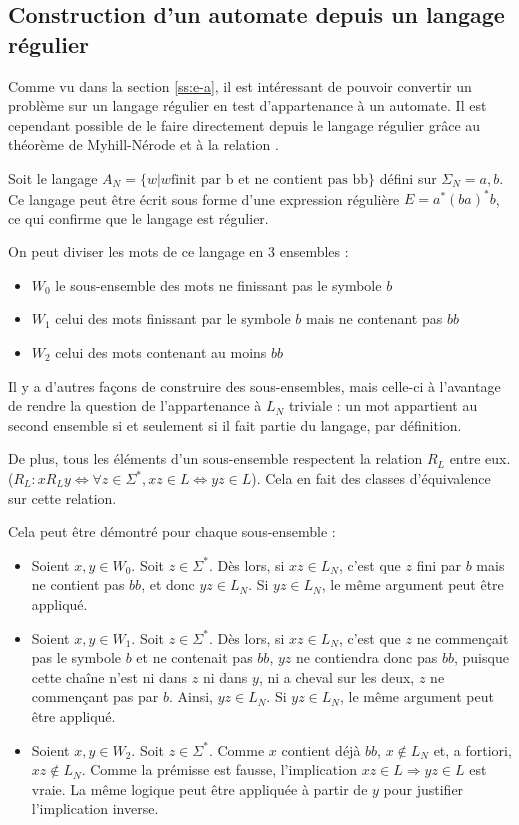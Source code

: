 

\subsection{Construction d'un automate depuis un langage régulier}

Comme vu dans la section \ref{ss:e-a}, il est intéressant de pouvoir convertir un problème sur un langage régulier en test d'appartenance à un automate. Il est cependant possible de le faire directement depuis le langage régulier grâce au théorème de Myhill-Nérode et à la relation \rl.

Soit le langage $A_N = \{w | w \text{finit par b et ne contient pas bb}\}$ défini sur $\Sigma_N = {a,b}$. Ce langage peut être écrit sous forme d'une expression régulière $E=a^*(ba)^*b$, ce qui confirme que le langage est régulier.

On peut diviser les mots de ce langage en 3 ensembles :

\begin{itemize}
 \item $W_0$ le sous-ensemble des mots ne finissant pas le symbole $b$
 \item $W_1$ celui des mots finissant par le symbole $b$ mais ne contenant pas $bb$
 \item $W_2$ celui des mots contenant au moins $bb$
\end{itemize}

Il y a d'autres façons de construire des sous-ensembles, mais celle-ci à l'avantage de rendre la question de l'appartenance à $L_N$ triviale : un mot appartient au second ensemble si et seulement si il fait partie du langage, par définition.

De plus, tous les éléments d'un sous-ensemble respectent la relation $R_L$ entre eux. ($R_L : xR_Ly \Leftrightarrow \forall z \in \Sigma^*, xz \in L \Leftrightarrow yz \in L$). Cela en fait des classes d'équivalence sur cette relation.

Cela peut être démontré pour chaque sous-ensemble :
\begin{itemize}
 \item Soient $x,y \in W_0$. Soit $z \in \Sigma^*$. Dès lors, si $xz \in L_N$, c'est que $z$ fini par $b$ mais ne contient pas $bb$, et donc $yz \in L_N$. Si $yz \in L_N$, le même argument peut être appliqué.
 \item Soient $x,y \in W_1$. Soit $z \in \Sigma^*$. Dès lors, si $xz \in L_N$, c'est que $z$ ne commençait pas le symbole $b$ et ne contenait pas $bb$, $yz$ ne contiendra donc pas $bb$, puisque cette chaîne n'est ni dans $z$ ni dans $y$, ni a cheval sur les deux, $z$ ne commençant pas par $b$. Ainsi, $yz \in L_N$. Si $yz \in L_N$, le même argument peut être appliqué.
 \item Soient $x,y \in W_2$. Soit $z \in \Sigma^*$. Comme $x$ contient déjà $bb$, $x \notin L_N$ et, a fortiori, $xz \notin L_N$. Comme la prémisse est fausse, l'implication $xz \in L \Rightarrow yz \in L$ est vraie. La même logique peut être appliquée à partir de $y$ pour justifier l'implication inverse.
\end{itemize}

